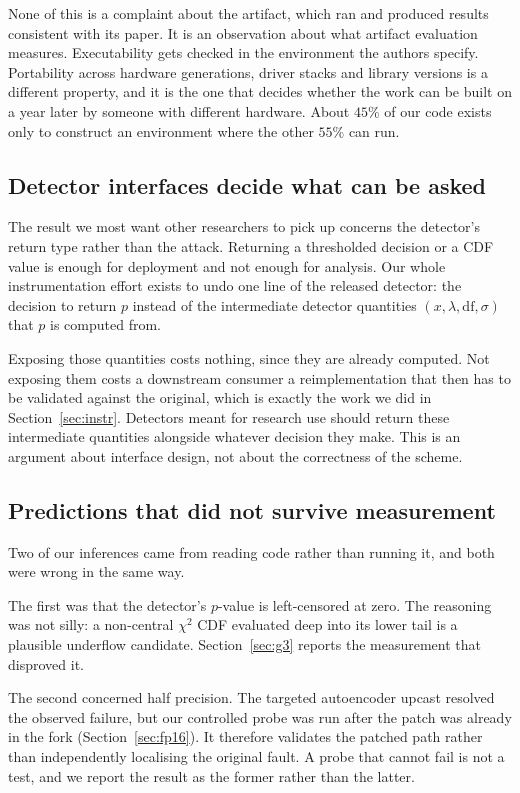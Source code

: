 \documentclass[10pt,twocolumn]{article}
\newcommand{\xstat}{\ensuremath{x}}
\newcommand{\lam}{\ensuremath{\lambda}}
\begin{document}
None of this is a complaint about the artifact, which ran and produced results
consistent with its paper. It is an observation about what artifact evaluation
measures. Executability gets checked in the environment the authors specify.
Portability across hardware generations, driver stacks and library versions is a
different property, and it is the one that decides whether the work can be built on a
year later by someone with different hardware. About $45\%$ of our code exists only to
construct an environment where the other $55\%$ can run.

\subsection{Detector interfaces decide what can be asked}

The result we most want other researchers to pick up concerns the detector's return
type rather than the attack. Returning a thresholded decision or a CDF value is enough
for deployment and not enough for analysis. Our whole instrumentation effort exists to
undo one line of the released detector: the decision to return $p$ instead of the
intermediate detector quantities $(\xstat, \lam, \mathrm{df}, \sigma)$ that $p$ is
computed from.

Exposing those quantities costs nothing, since they are already computed. Not exposing
them costs a downstream consumer a reimplementation that then has to be validated
against the original, which is exactly the work we did in
Section~\ref{sec:instr}. Detectors meant for research use should return these
intermediate quantities alongside whatever decision they make. This is an argument about
interface design, not about the correctness of the scheme.

\subsection{Predictions that did not survive measurement}

Two of our inferences came from reading code rather than running it, and both were
wrong in the same way.

The first was that the detector's $p$-value is left-censored at zero. The reasoning
was not silly: a non-central $\chi^2$ CDF evaluated deep into its lower tail is a
plausible underflow candidate. Section~\ref{sec:g3} reports the measurement that
disproved it.

The second concerned half precision. The targeted autoencoder upcast resolved the
observed failure, but our controlled probe was run after the patch was already in the
fork (Section~\ref{sec:fp16}). It therefore validates the patched path rather than
independently localising the original fault. A probe that cannot fail is not a test,
and we report the result as the former rather than the latter.
\end{document}
